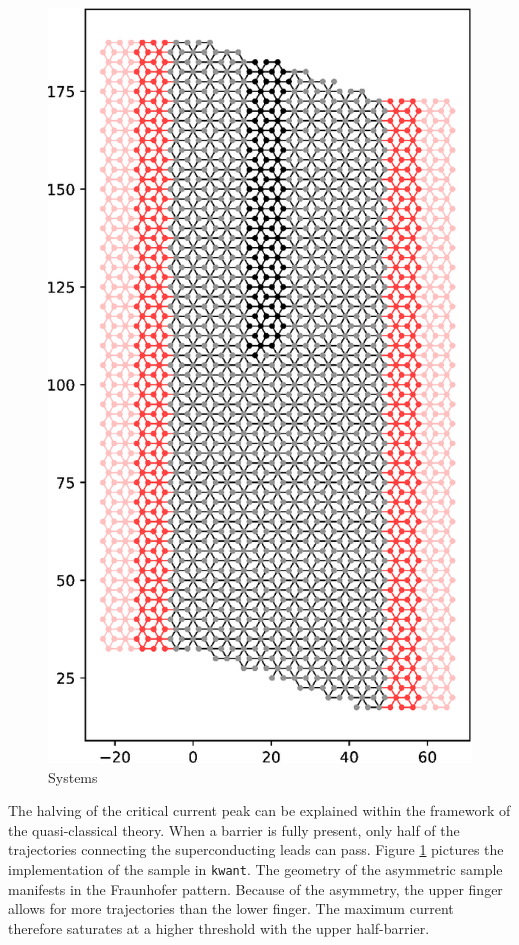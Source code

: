 \begin{figure}[ht]
\begin{minipage}[b]{0.3\linewidth}
\includegraphics[width=\textwidth]{figure/numericalmodel/hb-system}
\end{minipage}
\caption{Systems}\label{fig:systems}
\end{figure}

The halving of the critical current peak can be explained within the framework of the quasi-classical theory. When a barrier is fully present, only half of the trajectories connecting the superconducting leads can pass. Figure \ref{fig:systems} pictures the implementation of the sample in \texttt{kwant}. The geometry of the asymmetric sample manifests in the Fraunhofer pattern. Because of the asymmetry, the upper finger allows for more trajectories than the lower finger. The maximum current therefore saturates at a higher threshold with the upper half-barrier.

